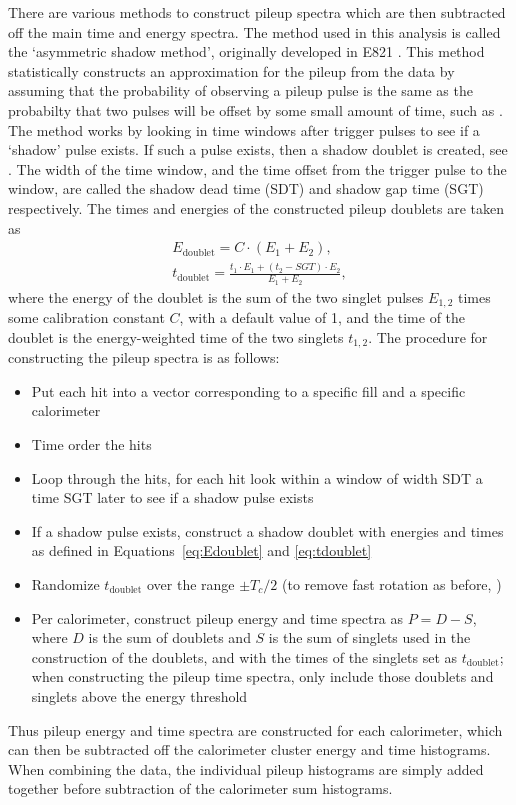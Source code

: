 There are various methods to construct pileup spectra which are then subtracted off the main time and energy spectra. The method used in this analysis is called the `asymmetric shadow method', originally developed in E821 \cite{E821PileupShadow}. This method statistically constructs an approximation for the pileup from the data by assuming that the probability of observing a pileup pulse is the same as the probabilty that two pulses will be offset by some small amount of time, such as . The method works by looking in time windows after trigger pulses to see if a `shadow' pulse exists. If such a pulse exists, then a shadow doublet is created, see . The width of the time window, and the time offset from the trigger pulse to the window, are called the shadow dead time (SDT) and shadow gap time (SGT) respectively. The times and energies of the constructed pileup doublets are taken as
            \begin{gather}
                E_{\text{doublet}} = C \cdot (E_{1} + E_{2}), \label{eq:Edoublet} \\
                t_{\text{doublet}} = \frac{t_{1} \cdot E_{1} + (t_{2}-SGT) \cdot E_{2}}{E_{1} + E_{2}}, \label{eq:tdoublet}
            \end{gather}
where the energy of the doublet is the sum of the two singlet pulses $E_{1,2}$ times some calibration constant $C$, with a default value of 1, and the time of the doublet is the energy-weighted time of the two singlets $t_{1,2}$. The procedure for constructing the pileup spectra is as follows:
\begin{itemize}
    \item{Put each hit into a vector corresponding to a specific fill and a specific calorimeter}
    \item{Time order the hits}
    \item{Loop through the hits, for each hit look within a window of width SDT a time SGT later to see if a shadow pulse exists}
    \item{If a shadow pulse exists, construct a shadow doublet with energies and times as defined in Equations~\ref{eq:Edoublet} and \ref{eq:tdoublet}}
    \item{Randomize $t_{\text{doublet}}$ over the range $\pm T_{c}/2$ (to remove fast rotation as before, )}
    \item{Per calorimeter, construct pileup energy and time spectra as $P = D - S$, where $D$ is the sum of doublets and $S$ is the sum of singlets used in the construction of the doublets, and with the times of the singlets set as $t_{\text{doublet}}$; when constructing the pileup time spectra, only include those doublets and singlets above the energy threshold}
\end{itemize}
Thus pileup energy and time spectra are constructed for each calorimeter, which can then be subtracted off the calorimeter cluster energy and time histograms. When combining the data, the individual pileup histograms are simply added together before subtraction of the calorimeter sum histograms. 


